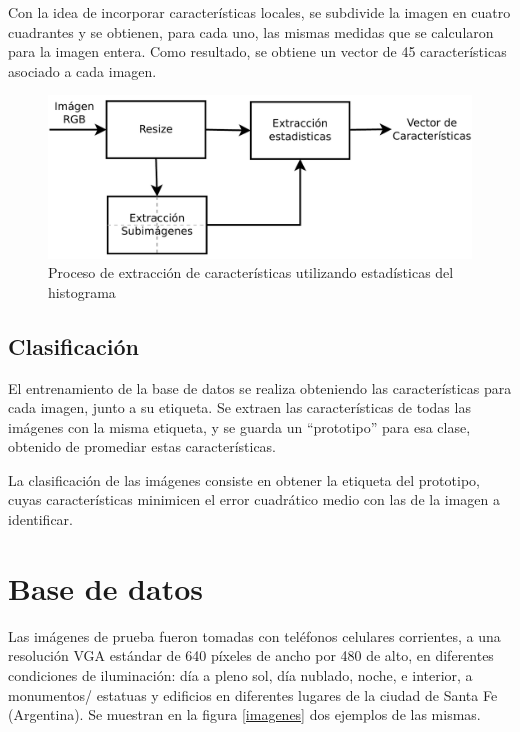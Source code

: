 \documentclass[conference,spanish,a4paper,10pt,oneside,final]{tfmpd}
\begin{document}
Con la idea de incorporar características locales, %
se subdivide  la imagen en cuatro 
cuadrantes y se obtienen, para cada uno, las mismas medidas que se calcularon para 
la imagen entera. Como resultado, se obtiene un vector de 45 características %
asociado a cada imagen.

\begin{figure}
\begin{center}
\includegraphics[scale=0.25]{../diagramas/procesoestadisticas} 
\end{center}
\caption{Proceso de extracción de características utilizando estadísticas del histograma}
\label{procesoestadisticas}
\end{figure}

\subsection{Clasificación}
El entrenamiento de la base de datos se realiza obteniendo las características
para cada imagen, junto a su etiqueta. %
Se extraen las características de todas las %
imágenes %
con la misma etiqueta, y se guarda un
``prototipo'' para esa clase, obtenido de promediar estas características.

La clasificación de las imágenes consiste en %
obtener la etiqueta del prototipo, cuyas características 
minimicen el error cuadrático medio con las de
la imagen a identificar.
%
%
%
%
\section{Base de datos}
Las imágenes de prueba fueron tomadas con teléfonos celulares corrientes, a una
resolución VGA estándar de 640 píxeles de ancho por 480 de alto, en
diferentes condiciones
de iluminación: día a pleno sol, día nublado, noche, e interior, a monumentos/%
estatuas y edificios en diferentes lugares de la ciudad de Santa Fe (Argentina).
Se muestran en la figura \ref{imagenes} dos ejemplos de las mismas.
%
%
%
%
\end{document}
